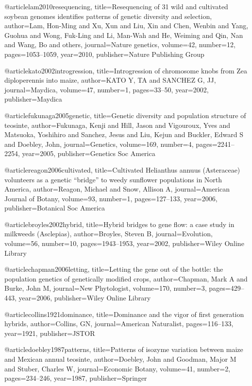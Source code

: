 @article{lam2010resequencing,
  title={Resequencing of 31 wild and cultivated soybean genomes identifies patterns of genetic diversity and selection},
  author={Lam, Hon-Ming and Xu, Xun and Liu, Xin and Chen, Wenbin and Yang, Guohua and Wong, Fuk-Ling and Li, Man-Wah and He, Weiming and Qin, Nan and Wang, Bo and others},
  journal={Nature genetics},
  volume={42},
  number={12},
  pages={1053--1059},
  year={2010},
  publisher={Nature Publishing Group}
}

@article{kato2002introgression,
  title={Introgression of chromosome knobs from Zea diploperennis into maize},
  author={KATO Y, TA and SANCHEZ G, JJ},
  journal={Maydica},
  volume={47},
  number={1},
  pages={33--50},
  year={2002},
  publisher={Maydica}
}

@article{fukunaga2005genetic,
  title={Genetic diversity and population structure of teosinte},
  author={Fukunaga, Kenji and Hill, Jason and Vigouroux, Yves and Matsuoka, Yoshihiro and Sanchez, Jesus and Liu, Kejun and Buckler, Edward S and Doebley, John},
  journal={Genetics},
  volume={169},
  number={4},
  pages={2241--2254},
  year={2005},
  publisher={Genetics Soc America}
}

@article{reagon2006cultivated,
  title={Cultivated Helianthus annuus (Asteraceae) volunteers as a genetic “bridge” to weedy sunflower populations in North America},
  author={Reagon, Michael and Snow, Allison A},
  journal={American Journal of Botany},
  volume={93},
  number={1},
  pages={127--133},
  year={2006},
  publisher={Botanical Soc America}
}

@article{broyles2002hybrid,
  title={Hybrid bridges to gene flow: a case study in milkweeds (Asclepias)},
  author={Broyles, Steven B},
  journal={Evolution},
  volume={56},
  number={10},
  pages={1943--1953},
  year={2002},
  publisher={Wiley Online Library}
}

@article{chapman2006letting,
  title={Letting the gene out of the bottle: the population genetics of genetically modified crops},
  author={Chapman, Mark A and Burke, John M},
  journal={New Phytologist},
  volume={170},
  number={3},
  pages={429--443},
  year={2006},
  publisher={Wiley Online Library}
}

@article{collins1921dominance,
  title={Dominance and the vigor of first generation hybrids},
  author={Collins, GN},
  journal={American Naturalist},
  pages={116--133},
  year={1921},
  publisher={JSTOR}
}

@article{doebley1987patterns,
  title={Patterns of isozyme variation between maize and Mexican annual teosinte},
  author={Doebley, John and Goodman, Major M and Stuber, Charles W},
  journal={Economic Botany},
  volume={41},
  number={2},
  pages={234--246},
  year={1987},
  publisher={Springer}
}


